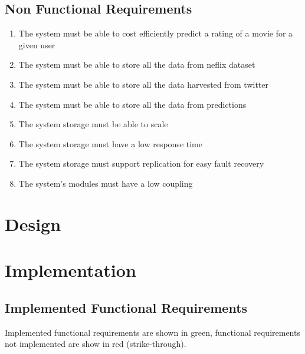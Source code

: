 \section{Non Functional Requirements}
\begin{enumerate}[label=\bfseries NFR \arabic*:]
  \item The system must be able to cost efficiently predict a rating of a movie for a given user
  \item The system must be able to store all the data from neflix dataset
  \item The system must be able to store all the data harvested from twitter
  \item The system must be able to store all the data from predictions
  \item The system storage must be able to scale
  \item The system storage must have a low response time
  \item The system storage must support replication for easy fault recovery
  \item The system's modules must have a low coupling
\end{enumerate}


\chapter{Design}\label{app:design}

\chapter{Implementation}\label{app:impl}
\section{Implemented Functional Requirements}
Implemented functional requirements are shown in green, functional requirements not implemented are show in red (strike-through).

